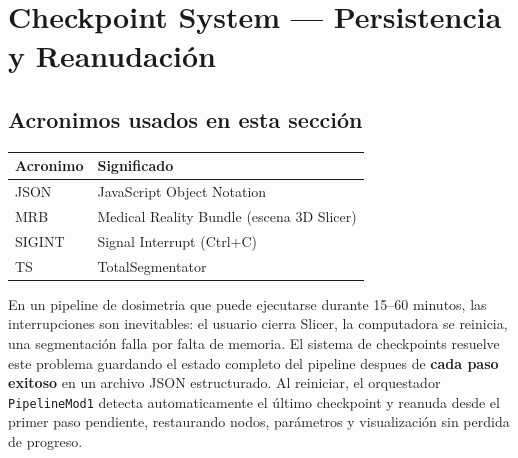 \documentclass[12pt,a4paper]{article}
\begin{document}
\begin{tcolorbox}[aiSupervisor]

\newpage


\newpage


\newpage

\end{tcolorbox}
\section{Checkpoint System --- Persistencia y Reanudación}
\label{sec:checkpoint}

\subsection*{Acronimos usados en esta sección}
\begin{tabular}{ll}
\toprule
\textbf{Acronimo} & \textbf{Significado} \\
\midrule
JSON & JavaScript Object Notation \\
MRB & Medical Reality Bundle (escena 3D Slicer) \\
SIGINT & Signal Interrupt (Ctrl+C) \\
TS & TotalSegmentator \\
\bottomrule
\end{tabular}

En un pipeline de dosimetria que puede ejecutarse durante 15--60 minutos, las interrupciones son
inevitables: el usuario cierra Slicer, la computadora se reinicia, una segmentación falla por
falta de memoria. El sistema de checkpoints resuelve este problema guardando el estado completo
del pipeline despues de \textbf{cada paso exitoso} en un archivo JSON estructurado. Al reiniciar,
el orquestador \texttt{PipelineMod1} detecta automaticamente el último checkpoint y reanuda desde
el primer paso pendiente, restaurando nodos, parámetros y visualización sin perdida de progreso.
\end{document}
